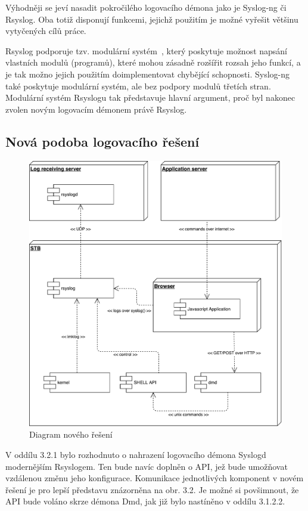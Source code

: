 \documentclass[thesis=B,czech]{FITthesis}[2012/06/26]
\begin{document}
Výhodněji se jeví nasadit pokročilého logovacího démona jako je Syslog-ng či Rsyslog. Oba totiž disponují funkcemi, jejichž použitím je možné vyřešit většinu vytyčených cílů práce.

Rsyslog podporuje tzv. modulární systém~\cite{rsysModules}, který poskytuje možnost napsání vlastních modulů (programů), které mohou zásadně rozšířit rozsah jeho funkcí, a je tak možno jejich použitím doimplementovat chybějící schopnosti. Syslog-ng také poskytuje modulární systém, ale bez podpory modulů třetích stran. Modulární systém Rsyslogu tak představuje hlavní argument, proč byl nakonec zvolen novým logovacím démonem právě Rsyslog.

\subsection{Nová podoba logovacího řešení}
\begin{figure}[H]
	\centering
	\includegraphics[scale=0.5]{images/diagram-noveho-reseni}
	\caption[Diagram nového řešení]{Diagram nového řešení}
\end{figure}

V oddílu 3.2.1 bylo rozhodnuto o nahrazení logovacího démona Syslogd modernějším Rsyslogem. Ten bude navíc doplněn o API, jež bude umožňovat vzdálenou změnu jeho konfigurace. Komunikace jednotlivých komponent v novém řešení je pro lepší představu znázorněna na obr. 3.2. Je možné si povšimnout, že API bude voláno skrze démona Dmd, jak již bylo nastíněno v oddílu 3.1.2.2.
\end{document}
